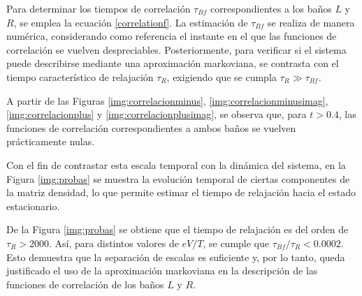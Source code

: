 \begin{appendixs}
Para determinar los tiempos de correlación $\tau_{Bf}$ correspondientes a los baños $L$ y $R$, se emplea la ecuación \eqref{correlationf}. La estimación de $\tau_{Bf}$ se realiza de manera numérica, considerando como referencia el instante en el que las funciones de correlación se vuelven despreciables. Posteriormente, para verificar si el sistema puede describirse mediante una aproximación markoviana, se contrasta con el tiempo característico de relajación $\tau_{R}$, exigiendo que se cumpla $\tau_{R} \gg \tau_{Bf}$.  



A partir de las Figuras \ref{img:correlacionminus}, \ref{img:correlacionminusimag}, \ref{img:correlacionplus} y \ref{img:correlacionplusimag}, se observa que, para $t > 0.4$, las funciones de correlación correspondientes a ambos baños se vuelven prácticamente nulas.  

Con el fin de contrastar esta escala temporal con la dinámica del sistema, en la Figura \ref{img:probas} se muestra la evolución temporal de ciertas componentes de la matriz densidad, lo que permite estimar el tiempo de relajación hacia el estado estacionario.  


De la Figura \ref{img:probas} se obtiene que el tiempo de relajación es del orden de $\tau_{R} > 2000$. Así, para distintos valores de $eV/T$, se cumple que $\tau_{Bf}/\tau_{R} < 0.0002$. Esto demuestra que la separación de escalas es suficiente y, por lo tanto, queda justificado el uso de la aproximación markoviana en la descripción de las funciones de correlación de los baños $L$ y $R$.  



\end{appendixs}
